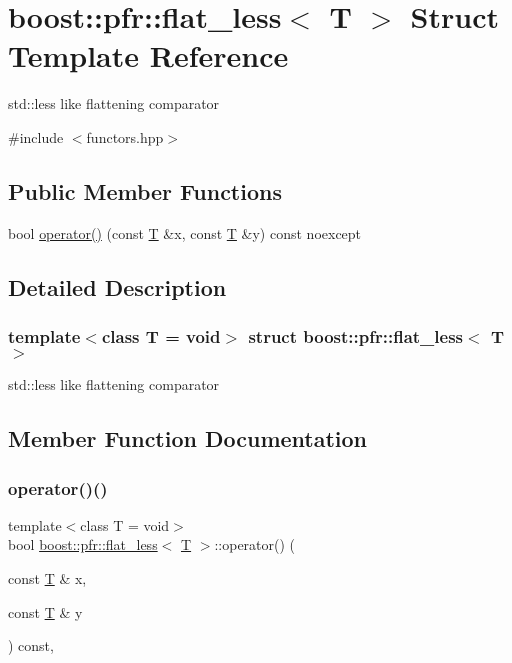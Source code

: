 \hypertarget{structboost_1_1pfr_1_1flat__less}{}\section{boost\+:\+:pfr\+:\+:flat\+\_\+less$<$ T $>$ Struct Template Reference}
\label{structboost_1_1pfr_1_1flat__less}


std\+::less like flattening comparator  




{\ttfamily \#include $<$functors.\+hpp$>$}

\subsection*{Public Member Functions}
\begin{DoxyCompactItemize}
\item 
bool \mbox{\hyperlink{structboost_1_1pfr_1_1flat__less_a8feabc3498cf26aa69270064c0d0df12}{operator()}} (const \mbox{\hyperlink{struct_t}{T}} \&x, const \mbox{\hyperlink{struct_t}{T}} \&y) const noexcept
\end{DoxyCompactItemize}


\subsection{Detailed Description}
\subsubsection*{template$<$class T = void$>$\newline
struct boost\+::pfr\+::flat\+\_\+less$<$ T $>$}

std\+::less like flattening comparator 

\subsection{Member Function Documentation}
\mbox{\label{structboost_1_1pfr_1_1flat__less_a8feabc3498cf26aa69270064c0d0df12}} 
\subsubsection{\texorpdfstring{operator()()}{operator()()}}
{\footnotesize\ttfamily template$<$class T  = void$>$ \\
bool \mbox{\hyperlink{structboost_1_1pfr_1_1flat__less}{boost\+::pfr\+::flat\+\_\+less}}$<$ \mbox{\hyperlink{struct_t}{T}} $>$\+::operator() (\begin{DoxyParamCaption}\item[{const \mbox{\hyperlink{struct_t}{T}} \&}]{x,  }\item[{const \mbox{\hyperlink{struct_t}{T}} \&}]{y }\end{DoxyParamCaption}) const\hspace{0.3cm}{\ttfamily [inline]}, {\ttfamily [noexcept]}}

